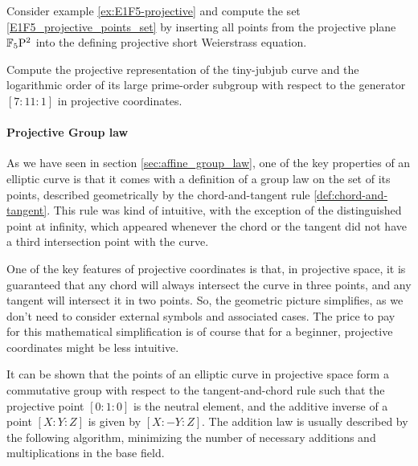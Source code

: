 \begin{exercise}
Consider example \ref{ex:E1F5-projective} and compute the set \ref{E1F5_projective_points_set} by inserting all points from the projective plane $\mathbb{F}_5\mathrm{P}^2$ into the defining projective short Weierstrass equation.
\end{exercise}

\begin{exercise}
Compute the projective representation of the tiny-jubjub curve and the logarithmic order of its large prime-order subgroup with respect to the generator $[7:11:1]$ in projective coordinates.
\end{exercise}

\paragraph{Projective Group law}
\label{sec:projective_group_law}
As we have seen in section \ref{sec:affine_group_law}, one of the key properties of an elliptic curve is that it comes with a definition of a group law on the set of its points, described geometrically by the chord-and-tangent rule \ref{def:chord-and-tangent}. This rule was kind of intuitive, with the exception of the distinguished point at infinity, which appeared whenever the chord or the tangent did not have a third intersection point with the curve.

One of the key features of projective coordinates is that, in projective space, it is guaranteed that any chord will always intersect the curve in three points, and any tangent will intersect it in two points. So, the geometric picture simplifies, as we don't need to consider external symbols and associated cases. The price to pay for this mathematical simplification is of course that for a beginner, projective coordinates might be less intuitive.

It can be shown that the points of an elliptic curve in projective space form a commutative group with respect to the tangent-and-chord rule such that the projective point $[0:1:0]$ is the neutral element, and the additive inverse of a point $[X:Y:Z]$ is given by $[X:-Y:Z]$. The addition law is usually described by the following algorithm, minimizing the number of necessary additions and multiplications in the base field. 

